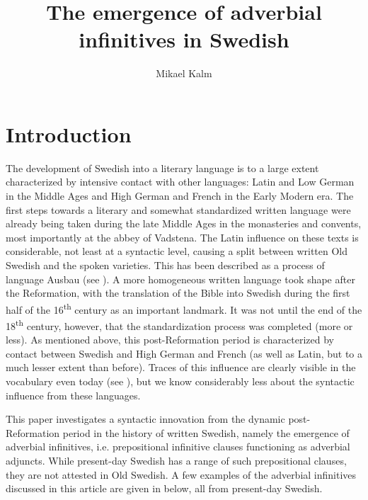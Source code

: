 \documentclass[output=paper]{langscibook}
\author{Mikael Kalm\affiliation{Stockholm University}}
\title{The emergence of adverbial infinitives in Swedish }
\begin{document}
\maketitle 



\section{Introduction}\label{sec:kalm:1}


The development of Swedish into a literary language is to a large extent characterized by intensive contact with other languages: Latin and Low German in the Middle Ages and High German and French in the Early Modern era. The first steps towards a literary and somewhat standardized written language were already being taken during the late Middle Ages in the monasteries and convents, most importantly at the abbey of Vadstena. The Latin influence on these texts is considerable, not least at a syntactic level, causing a split between written Old Swedish and the spoken varieties. This has been described as a process of language Ausbau (see \citealt{Hoder2009, Hoder2010}). A more homogeneous written language took shape after the Reformation, with the translation of the Bible into Swedish during the first half of the 16\textsuperscript{th} century as an important landmark. It was not until the end of the 18\textsuperscript{th} century, however, that the standardization process was completed (more or less). As mentioned above, this post-Reformation period is characterized by contact between Swedish and High German and French (as well as Latin, but to a much lesser extent than before). Traces of this influence are clearly visible in the vocabulary even today (see \citealt{Teleman2003Swedish,Teleman2003Tradis}), but we know considerably less about the syntactic influence from these languages. 



This paper investigates a syntactic innovation from the dynamic post-Ref\-or\-ma\-tion period in the history of written Swedish, namely the emergence of adverbial infinitives, i.e. prepositional infinitive clauses functioning as adverbial adjuncts. While present-day Swedish has a range of such prepositional clauses, they are not attested in Old Swedish. A few examples of the adverbial infinitives discussed in this article are given in  below, all from present-day Swedish.    
\end{document}
